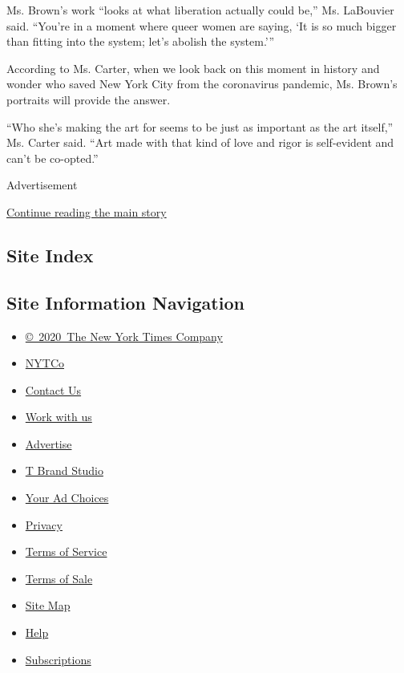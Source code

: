 Ms. Brown's work ``looks at what liberation actually could be,'' Ms.
LaBouvier said. ``You're in a moment where queer women are saying, `It
is so much bigger than fitting into the system; let's abolish the
system.'''

According to Ms. Carter, when we look back on this moment in history and
wonder who saved New York City from the coronavirus pandemic, Ms.
Brown's portraits will provide the answer.

``Who she's making the art for seems to be just as important as the art
itself,'' Ms. Carter said. ``Art made with that kind of love and rigor
is self-evident and can't be co-opted.''

Advertisement

\protect\hyperlink{after-bottom}{Continue reading the main story}

\hypertarget{site-index}{%
\subsection{Site Index}\label{site-index}}

\hypertarget{site-information-navigation}{%
\subsection{Site Information
Navigation}\label{site-information-navigation}}

\begin{itemize}
\tightlist
\item
  \href{https://help.nytimes.com/hc/en-us/articles/115014792127-Copyright-notice}{©~2020~The
  New York Times Company}
\end{itemize}

\begin{itemize}
\tightlist
\item
  \href{https://www.nytco.com/}{NYTCo}
\item
  \href{https://help.nytimes.com/hc/en-us/articles/115015385887-Contact-Us}{Contact
  Us}
\item
  \href{https://www.nytco.com/careers/}{Work with us}
\item
  \href{https://nytmediakit.com/}{Advertise}
\item
  \href{http://www.tbrandstudio.com/}{T Brand Studio}
\item
  \href{https://www.nytimes.com/privacy/cookie-policy\#how-do-i-manage-trackers}{Your
  Ad Choices}
\item
  \href{https://www.nytimes.com/privacy}{Privacy}
\item
  \href{https://help.nytimes.com/hc/en-us/articles/115014893428-Terms-of-service}{Terms
  of Service}
\item
  \href{https://help.nytimes.com/hc/en-us/articles/115014893968-Terms-of-sale}{Terms
  of Sale}
\item
  \href{https://spiderbites.nytimes.com}{Site Map}
\item
  \href{https://help.nytimes.com/hc/en-us}{Help}
\item
  \href{https://www.nytimes.com/subscription?campaignId=37WXW}{Subscriptions}
\end{itemize}
